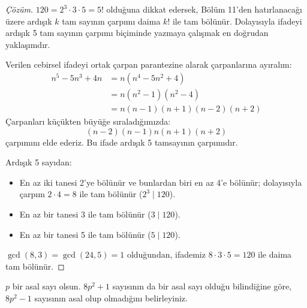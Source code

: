\begin{proof}[Çözüm]
$120 = 2^3 \cdot 3 \cdot 5 = 5!$ olduğuna dikkat edersek, Bölüm 11'den hatırlanacağı üzere ardışık $k$ tam sayının çarpımı daima $k!$ ile tam bölünür. Dolayısıyla ifadeyi ardışık 5 tam sayının çarpımı biçiminde yazmaya çalışmak en doğrudan yaklaşımdır.

Verilen cebirsel ifadeyi ortak çarpan parantezine alarak çarpanlarına ayıralım:
\begin{align*}
n^5 - 5n^3 + 4n &= n(n^4 - 5n^2 + 4) \\
&= n(n^2 - 1)(n^2 - 4) \\
&= n(n - 1)(n + 1)(n - 2)(n + 2)
\end{align*}
Çarpanları küçükten büyüğe sıraladığımızda:
\[
(n - 2)(n - 1)n(n + 1)(n + 2)
\]
çarpımını elde ederiz. Bu ifade ardışık 5 tamsayının çarpımıdır. 

Ardışık 5 sayıdan:
\begin{itemize}
    \item En az iki tanesi 2'ye bölünür ve bunlardan biri en az 4'e bölünür; dolayısıyla çarpım $2 \cdot 4 = 8$ ile tam bölünür ($2^3 \mid 120$).
    \item En az bir tanesi 3 ile tam bölünür ($3 \mid 120$).
    \item En az bir tanesi 5 ile tam bölünür ($5 \mid 120$).
\end{itemize}
$\gcd(8, 3) = \gcd(24, 5) = 1$ olduğundan, ifademiz $8 \cdot 3 \cdot 5 = 120$ ile daima tam bölünür.
\end{proof}

\begin{example}
$p$ bir asal sayı olsun. $8p^2 + 1$ sayısının da bir asal sayı olduğu bilindiğine göre, $8p^2 - 1$ sayısının asal olup olmadığını belirleyiniz.
\end{example}

